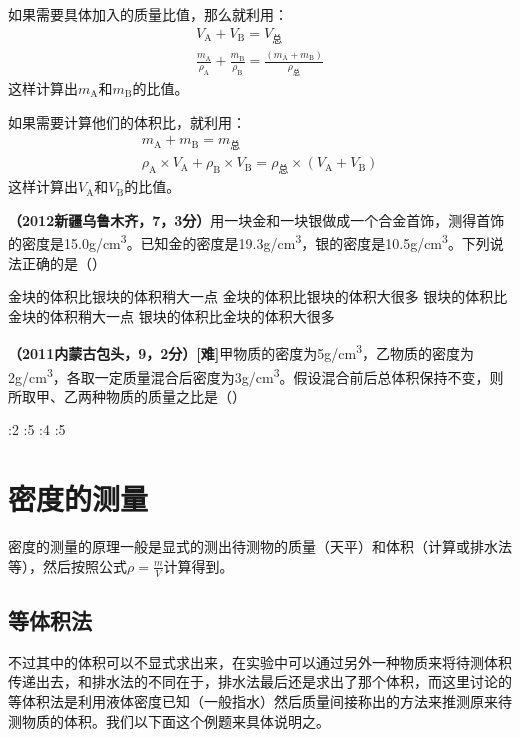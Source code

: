 \documentclass[12pt,twoside]{exam}
\begin{document}
\begin{knowledge}
如果需要具体加入的质量比值，那么就利用：
\begin{align*}
V_\textrm{A}+V_\textrm{B}=V_\textrm{总} \\
\frac{m_\textrm{A}}{\rho_\textrm{A}} + \frac{m_\textrm{B}}{\rho_\textrm{B}}=\frac{(m_\textrm{A}+m_\textrm{B})}{\rho_\textrm{总}}
\end{align*}
这样计算出$m_\textrm{A}$和$m_\textrm{B}$的比值。

如果需要计算他们的体积比，就利用：
\begin{align*}
m_\textrm{A}+m_\textrm{B}=m_\textrm{总} \\
\rho_\textrm{A} \times V_\textrm{A} +\rho_\textrm{B} \times V_\textrm{B}=\rho_\textrm{总} \times (V_\textrm{A}+V_\textrm{B})
\end{align*}
这样计算出$V_\textrm{A}$和$V_\textrm{B}$的比值。

\textbf{（2012新疆乌鲁木齐，7，3分）}用一块金和一块银做成一个合金首饰，测得首饰的密度是15.0\si{g/cm^3}。已知金的密度是19.3\si{g/cm^3}，银的密度是10.5\si{g/cm^3}。下列说法正确的是（\answerline*[A]）
\begin{choices}
\choice 金块的体积比银块的体积稍大一点
\choice 金块的体积比银块的体积大很多
\choice 银块的体积比金块的体积稍大一点
\choice 银块的体积比金块的体积大很多
\end{choices}

\textbf{（2011内蒙古包头，9，2分）[难]}甲物质的密度为5\si{g/cm^3}，乙物质的密度为2\si{g/cm^3}，各取一定质量混合后密度为3\si{g/cm^3}。假设混合前后总体积保持不变，则所取甲、乙两种物质的质量之比是（\answerline*[C]）

\begin{oneparchoices}
:2
:5
:4
:5
\end{oneparchoices}



\section{密度的测量}
密度的测量的原理一般是显式的测出待测物的质量（天平）和体积（计算或排水法等），然后按照公式{\large $\rho=\frac{m}{V}$}计算得到。



\subsection{等体积法}
不过其中的体积可以不显式求出来，在实验中可以通过另外一种物质来将待测体积传递出去，和排水法的不同在于，排水法最后还是求出了那个体积，而这里讨论的等体积法是利用液体密度已知（一般指水）然后质量间接称出的方法来推测原来待测物质的体积。我们以下面这个例题来具体说明之。


\end{knowledge}
\end{document}
